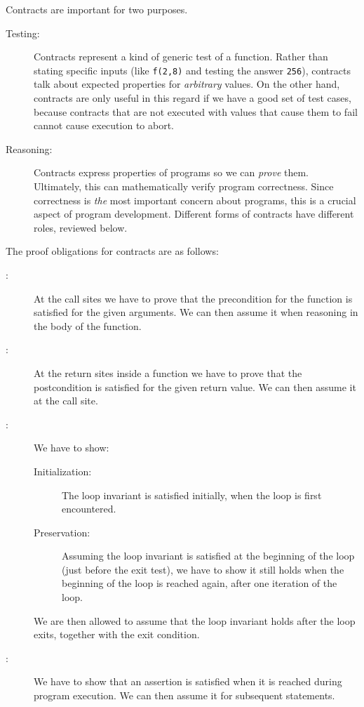 Contracts are important for two purposes.
\begin{description}
\item[Testing:] Contracts represent a kind of generic test of a function.
  Rather than stating specific inputs (like \lstinline'f(2,8)' and testing the
  answer \lstinline'256'), contracts talk about expected properties for
  \emph{arbitrary} values.  On the other hand, contracts are only useful in
  this regard if we have a good set of test cases, because contracts that are
  not executed with values that cause them to fail cannot cause execution to
  abort.
\item[Reasoning:] Contracts express properties of programs so we can
  \emph{prove} them.  Ultimately, this can mathematically verify program
  correctness.  Since correctness is \emph{the} most important concern about
  programs, this is a crucial aspect of program development.  Different forms
  of contracts have different roles, reviewed below.
\end{description}

The proof obligations for contracts are as follows:
\begin{description}
\item[\requires:] At the call sites we have to prove that
  the precondition for the function is satisfied for the given
  arguments.  We can then assume it when reasoning in the body
  of the function.
\item[\ensures:] At the return sites inside a function
  we have to prove that the postcondition is satisfied for the
  given return value.  We can then assume it at the call site.
\item[\loopinvariant:] We have to show:
  \begin{description}
  \item[Initialization:] The loop invariant is satisfied initially, when
    the loop is first encountered.
  \item[Preservation:] Assuming the loop invariant is satisfied at the
    beginning of the loop (just before the exit test), we have to show
    it still holds when the beginning of the loop is reached again,
    after one iteration of the loop.
  \end{description}
  We are then allowed to assume that the loop invariant holds after
  the loop exits, together with the exit condition.
\item[\assert:] We have to show that an assertion is
  satisfied when it is reached during program execution.  We can then
  assume it for subsequent statements.
\end{description}

